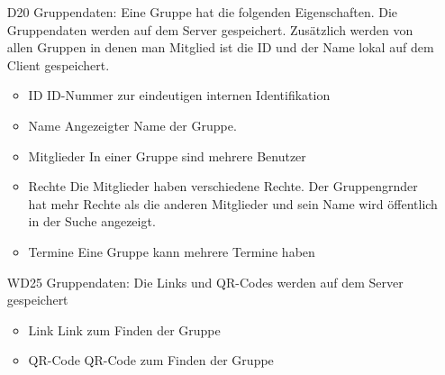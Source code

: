 \documentclass{scrartcl}
\begin{document}
\begin{itemize}
		
		\item [D20] Gruppendaten:
		\newline Eine Gruppe hat die folgenden Eigenschaften.
		Die Gruppendaten werden auf dem Server gespeichert. Zusätzlich werden von allen Gruppen in denen man Mitglied ist die ID und der Name lokal auf dem Client gespeichert.
		\begin{itemize}
			\item ID
			\newline ID-Nummer zur eindeutigen internen Identifikation
			\item Name
			\newline Angezeigter Name der Gruppe.
			\item Mitglieder
			\newline In einer Gruppe sind mehrere Benutzer
			\item Rechte
			\newline Die Mitglieder haben verschiedene Rechte. Der \gls{Gruppengrnder} hat mehr Rechte als die anderen Mitglieder und sein Name wird öffentlich in der Suche angezeigt.
			\item Termine
			\newline Eine Gruppe kann mehrere Termine haben
		\end{itemize}
		
		
		\item [WD25] Gruppendaten:
		\newline Die Links und QR-Codes werden auf dem Server gespeichert
		\begin{itemize}
			\item Link
			\newline Link zum Finden der Gruppe
			\item QR-Code
			\newline QR-Code zum Finden der Gruppe
		\end{itemize}
		

\end{itemize}
\end{document}
